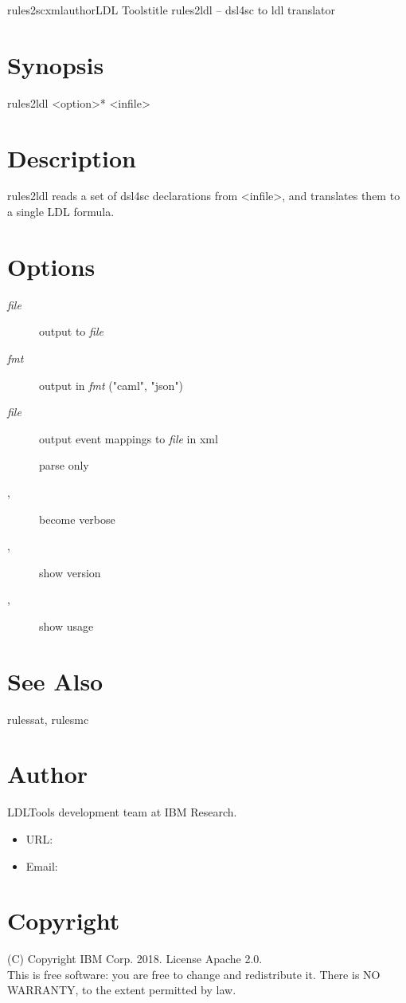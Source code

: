 \documentclass[fancy]{article}
\begin{document}
\begin{Name}{1}{rules2scxml}{author}{LDL Tools}{title}
rules2ldl -- dsl4sc to ldl translator
\end{Name}

\section{Synopsis}
rules2ldl <option>* <infile>

\section{Description}
rules2ldl reads a set of dsl4sc declarations from <infile>,
and translates them to a single LDL formula.

\section{Options}

\begin{description}
\item[ \emph{file}]
  output to \emph{file}
\item[ \emph{fmt}]
  output in \emph{fmt} ("caml", "json")
\item[ \emph{file}]
  output event mappings to \emph{file} in xml
\item[]
  parse only
%
\item[, ]
  become verbose
\item[, ]
  show version
\item[, ]
  show usage

\end{description}

\section{See Also}
rulessat, rulesmc

\section{Author}
LDLTools development team at IBM Research.

\begin{itemize}
\item URL: 
\item Email: 
\end{itemize}

\section{Copyright}
(C) Copyright IBM Corp. 2018.
License Apache 2.0.\\

This is free software: you are free to change and redistribute it.
There is NO  WARRANTY,  to the extent permitted by law.
\end{document}
